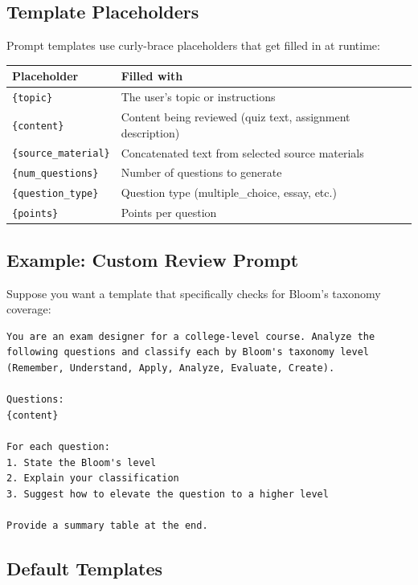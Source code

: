 \documentclass[12pt,letterpaper]{article}
\begin{document}
\subsection{Template Placeholders}

Prompt templates use curly-brace placeholders that get filled in at runtime:

\begin{table}[h]
\centering
\begin{tabular}{ll}
\toprule
\textbf{Placeholder} & \textbf{Filled with} \\
\midrule
\texttt{\{topic\}} & The user's topic or instructions \\
\texttt{\{content\}} & Content being reviewed (quiz text, assignment description) \\
\texttt{\{source\_material\}} & Concatenated text from selected source materials \\
\texttt{\{num\_questions\}} & Number of questions to generate \\
\texttt{\{question\_type\}} & Question type (multiple\_choice, essay, etc.) \\
\texttt{\{points\}} & Points per question \\
\bottomrule
\end{tabular}
\end{table}

\subsection{Example: Custom Review Prompt}

Suppose you want a template that specifically checks for Bloom's taxonomy coverage:

\begin{lstlisting}[title={Example custom prompt template}]
You are an exam designer for a college-level course. Analyze the
following questions and classify each by Bloom's taxonomy level
(Remember, Understand, Apply, Analyze, Evaluate, Create).

Questions:
{content}

For each question:
1. State the Bloom's level
2. Explain your classification
3. Suggest how to elevate the question to a higher level

Provide a summary table at the end.
\end{lstlisting}

\subsection{Default Templates}
\end{document}
